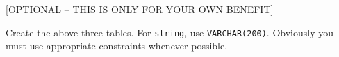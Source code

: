 [OPTIONAL -- THIS IS ONLY FOR YOUR OWN BENEFIT]

Create the above three tables. For \verb!string!, use \verb!VARCHAR(200)!.
Obviously you must use appropriate constraints whenever possible.
